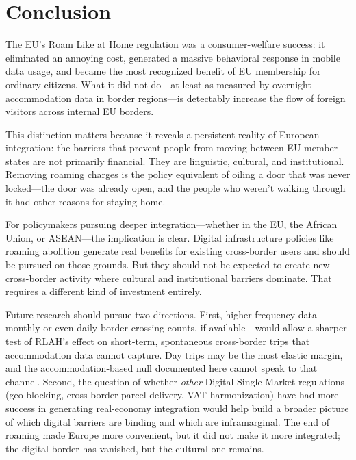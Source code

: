 \documentclass[12pt]{article}
\begin{document}
\section{Conclusion}

The EU's Roam Like at Home regulation was a consumer-welfare success: it eliminated an annoying cost, generated a massive behavioral response in mobile data usage, and became the most recognized benefit of EU membership for ordinary citizens. What it did not do---at least as measured by overnight accommodation data in border regions---is detectably increase the flow of foreign visitors across internal EU borders.

This distinction matters because it reveals a persistent reality of European integration: the barriers that prevent people from moving between EU member states are not primarily financial. They are linguistic, cultural, and institutional. Removing roaming charges is the policy equivalent of oiling a door that was never locked---the door was already open, and the people who weren't walking through it had other reasons for staying home.

For policymakers pursuing deeper integration---whether in the EU, the African Union, or ASEAN---the implication is clear. Digital infrastructure policies like roaming abolition generate real benefits for existing cross-border users and should be pursued on those grounds. But they should not be expected to create new cross-border activity where cultural and institutional barriers dominate. That requires a different kind of investment entirely.

Future research should pursue two directions. First, higher-frequency data---monthly or even daily border crossing counts, if available---would allow a sharper test of RLAH's effect on short-term, spontaneous cross-border trips that accommodation data cannot capture. Day trips may be the most elastic margin, and the accommodation-based null documented here cannot speak to that channel. Second, the question of whether \textit{other} Digital Single Market regulations (geo-blocking, cross-border parcel delivery, VAT harmonization) have had more success in generating real-economy integration would help build a broader picture of which digital barriers are binding and which are inframarginal. The end of roaming made Europe more convenient, but it did not make it more integrated; the digital border has vanished, but the cultural one remains.
\end{document}
